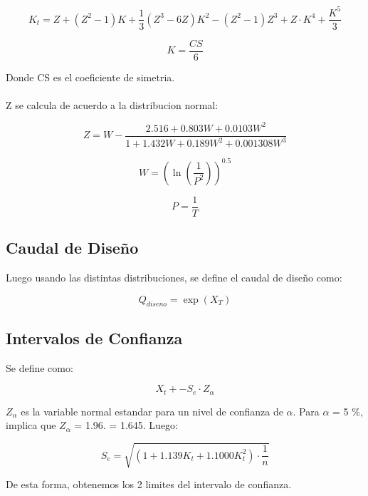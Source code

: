 \begin{equation}
    K_t = Z + (Z^2 - 1)K + \frac{1}{3}(Z^3 - 6Z)K^2 - (Z^2-1)Z^3 + Z\cdot K^4 + \frac{K^5}{3}
\end{equation}

\begin{equation}
    K = \frac{CS}{6}
\end{equation}

Donde CS es el coeficiente de simetria.
\\ \\
Z se calcula de acuerdo a la distribucion normal:

\begin{equation}
    Z = W -  \frac{2.516 + 0.803W + 0.0103W^2}{1 + 1.432W + 0.189W^2 + 0.001308W^3}
\end{equation}

\begin{equation}
    W = (\ln(\frac{1}{P^2}))^{0.5}
\end{equation}

\begin{equation}
    P = \frac{1}{T}
\end{equation}

\subsection{Caudal de Diseño}

Luego usando las distintas distribuciones, se define el caudal de diseño como:

\begin{equation}
    Q_{diseno} = \exp(X_T)
\end{equation}

\subsection{Intervalos de Confianza}

Se define como:

\begin{equation}
    X_t + - S_e \cdot Z_{\alpha}
\end{equation}

\textbf{$Z_{\alpha}$} es la variable normal estandar para un nivel de confianza de $\alpha$. Para $\alpha$ = 5 \%, implica que $Z_{\alpha}$ = 1.96. = 1.645. Luego:

\begin{equation}
    S_e = \sqrt{(1+1.139K_t + 1.1000K_t^2) \cdot \frac{1}{n}}
\end{equation}

De esta forma, obtenemos los 2 limites del intervalo de confianza.